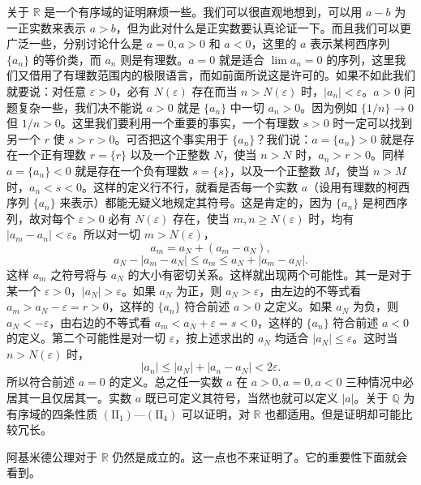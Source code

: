 关于 $\mathbb R$ 是一个有序域的证明麻烦一些。我们可以很直观地想到，可以用 $a-b$ 为一正实数来表示 $a>b$，但为此对什么是正实数要认真论证一下。而且我们可以更广泛一些，分别讨论什么是 $a=0,a>0$ 和 $a<0$，这里的 $a$ 表示某柯西序列 $\{a_n\}$ 的等价类，而 $a_n$ 则是有理数。$a=0$ 就是适合 $\lim a_n=0$ 的序列，这里我们又借用了有理数范围内的极限语言，而如前面所说这是许可的。如果不如此我们就要说：对任意 $\varepsilon>0$，必有 $N(\varepsilon)$ 存在而当 $n>N(\varepsilon)$ 时，$|a_n|<\varepsilon$。$a>0$ 问题复杂一些，我们决不能说 $a>0$ 就是 $\{a_n\}$ 中一切 $a_n>0$。因为例如 $\{1/n\}\to0$ 但 $1/n>0$。这里我们要利用一个重要的事实，一个有理数 $s>0$ 时一定可以找到另一个 $r$ 使 $s>r>0$。可否把这个事实用于 $\{a_n\}$？我们说：$a=\{a_n\}>0$ 就是存在一个正有理数 $r=\{r\}$ 以及一个正整数 $N$，使当 $n>N$ 时，$a_n>r>0$。同样 $a=\{a_n\}<0$ 就是存在一个负有理数 $s=\{s\}$，以及一个正整数 $M$，使当 $n>M$ 时，$a_n<s<0$。这样的定义行不行，就看是否每一个实数 $a$（设用有理数的柯西序列 $\{a_n\}$ 来表示）都能无疑义地规定其符号。这是肯定的，因为 $\{a_n\}$ 是柯西序列，故对每个 $\varepsilon>0$ 必有 $N(\varepsilon)$ 存在，使当 $m,n\ge N(\varepsilon)$ 时，均有 $|a_m-a_n|<\varepsilon$。所以对一切 $m>N(\varepsilon)$，
\[
 a_m=a_{N}+(a_m-a_N),
\]
\[
 a_N-|a_m-a_N|\le a_m\le a_N+|a_m-a_N|.
\]
这样 $a_m$ 之符号将与 $a_N$ 的大小有密切关系。这样就出现两个可能性。其一是对于某一个 $\varepsilon>0$，$|a_N|>\varepsilon$。如果 $a_N$ 为正，则 $a_N>\varepsilon$，由左边的不等式看 $a_m>a_N-\varepsilon=r>0$，这样的 $\{a_n\}$ 符合前述 $a>0$ 之定义。如果 $a_N$ 为负，则 $a_N<-\varepsilon$，由右边的不等式看 $a_m<a_N+\varepsilon=s<0$，这样的 $\{a_n\}$ 符合前述 $a<0$ 的定义。第二个可能性是对一切 $\varepsilon$，按上述求出的 $a_N$ 均适合 $|a_N|\le\varepsilon$。这时当 $n>N(\varepsilon)$ 时，
\[
 |a_n|\le|a_N|+|a_n-a_N|<2\varepsilon.
\]
所以符合前述 $a=0$ 的定义。总之任一实数 $a$ 在 $a>0,a=0,a<0$ 三种情况中必居其一且仅居其一。实数 $a$ 既已可定义其符号，当然也就可以定义 $|a|$。关于 $\mathbb Q$ 为有序域的四条性质 $(\mathrm{II}_1)$—$(\mathrm{II}_4)$ 可以证明，对 $\mathbb R$ 也都适用。但是证明却可能比较冗长。

阿基米德公理对于 $\mathbb R$ 仍然是成立的。这一点也不来证明了。它的重要性下面就会看到。

